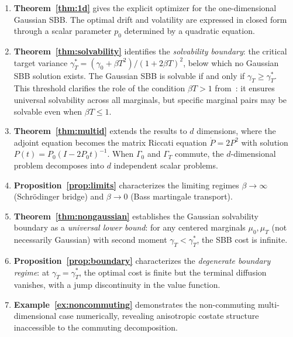\documentclass[12pt]{article}
\theoremstyle{definition}
\begin{document}
\begin{enumerate}[label=(\roman*)]
\item \textbf{Theorem~\ref{thm:1d}} gives the explicit optimizer for the
one-dimensional Gaussian SBB.
The optimal drift and volatility are expressed in closed form through a
scalar parameter $p_0$ determined by a quadratic equation.

\item \textbf{Theorem~\ref{thm:solvability}} identifies the
\emph{solvability boundary}: the critical target variance
$\gamma_T^* = (\gamma_0 + \beta T^2)/(1 + 2\beta T)^2$,
below which no Gaussian SBB solution exists.
The Gaussian SBB is solvable if and only if
$\gamma_T \ge \gamma_T^*$.
This threshold clarifies the role of the condition
$\beta T > 1$ from~\cite{HLMPT26}: it ensures universal solvability
across all marginals, but specific marginal pairs may be solvable
even when $\beta T \le 1$.

\item \textbf{Theorem~\ref{thm:multid}} extends the results to $d$
dimensions, where the adjoint equation becomes the matrix Riccati
equation $\dot P = 2P^2$ with solution
$P(t) = P_0(I - 2P_0 t)^{-1}$.
When $\Gamma_0$ and $\Gamma_T$ commute, the $d$-dimensional problem
decomposes into $d$ independent scalar problems.

\item \textbf{Proposition~\ref{prop:limits}} characterizes the limiting
regimes $\beta\to\infty$ (Schr\"odinger bridge) and $\beta\to 0$
(Bass martingale transport).

\item \textbf{Theorem~\ref{thm:nongaussian}} establishes the Gaussian
solvability boundary as a \emph{universal lower bound}: for any
centered marginals $\mu_0, \mu_T$ (not necessarily Gaussian) with
second moment $\gamma_T < \gamma_T^*$, the SBB cost is infinite.

\item \textbf{Proposition~\ref{prop:boundary}} characterizes the
\emph{degenerate boundary regime}: at $\gamma_T = \gamma_T^*$,
the optimal cost is finite but the terminal diffusion vanishes,
with a jump discontinuity in the value function.

\item \textbf{Example~\ref{ex:noncommuting}} demonstrates the
non-commuting multi-dimensional case numerically, revealing
anisotropic costate structure inaccessible to the commuting
decomposition.
\end{enumerate}
\end{document}
